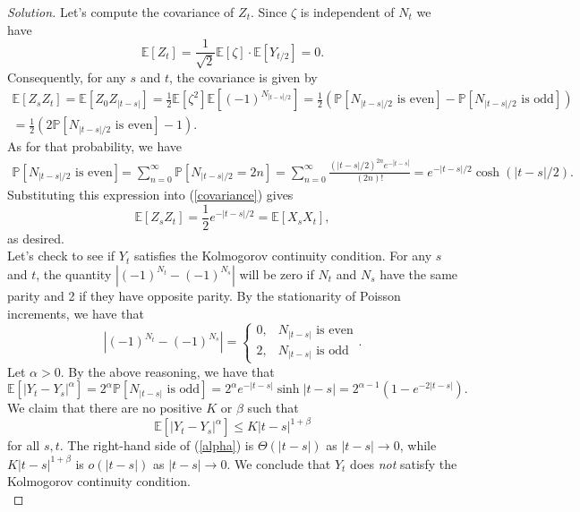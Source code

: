 \documentclass[11pt,letterpaper]{report}
\newcommand{\E}{\mathbb{E}}
\newcommand{\Prob}{\mathbb{P}}
\newenvironment{solution}
{\begin{proof}[Solution]}
{\end{proof}}
\begin{document}
\begin{solution}
	\noindent Let's compute the covariance of $Z_t$. Since $\zeta$ is independent of $N_t$ we have
	\[
	\E[Z_t] = \frac{1}{\sqrt{2}}\E[\zeta]\cdot \E[Y_{t/2}] = 0.
	\]
	Consequently, for any $s$ and $t$, the covariance is given by
	\begin{multline}\label{covariance}
		\E[Z_sZ_t] = \E[Z_0Z_{|t-s|}] = \frac{1}{2}\E[\zeta^2]\E\left[(-1)^{N_{|t-s|/2}}\right] = \frac{1}{2}\left(\Prob[N_{|t-s|/2}\text{ is even}] - \Prob[N_{|t-s|/2}\text{ is odd}]\right)\\
		= \frac{1}{2}(2\Prob[N_{|t-s|/2}\text{ is even}] - 1).
	\end{multline}
	As for that probability, we have
	\begin{align*}
		\Prob[N_{|t-s|/2}\text{ is even}] &= \sum_{n=0}^\infty\Prob[N_{|t-s|/2} = 2n] = \sum_{n=0}^\infty \frac{(|t-s|/2)^{2n}e^{-|t-s|}}{(2n)!} = e^{-|t-s|/2}\cosh(|t-s|/2).
	\end{align*}
	Substituting this expression into (\ref{covariance}) gives
	\[
	\E[Z_sZ_t] = \frac{1}{2}e^{-|t-s|/2} = \E[X_sX_t],
	\]
	as desired.\\

	\noindent Let's check to see if $Y_t$ satisfies the Kolmogorov continuity condition. For any $s$ and $t$, the quantity $|(-1)^{N_t} - (-1)^{N_s}|$ will be zero if $N_t$ and $N_s$ have the same parity and 2 if they have opposite parity. By the stationarity of Poisson increments, we have that
	\[
	\left|(-1)^{N_t} - (-1)^{N_s}\right| = \begin{cases}
		0,& N_{|t-s|}\text{ is even}\\
		2,& N_{|t-s|}\text{ is odd}
	\end{cases}.
	\]
	Let $\alpha>0$. By the above reasoning, we have that
	\begin{equation}\label{alpha}
	\E[|Y_t-Y_s|^\alpha] = 2^\alpha\Prob[N_{|t-s|}\text{ is odd}] = 2^\alpha e^{-|t-s|}\sinh |t-s| = 2^{\alpha-1}\left(1-e^{-2|t-s|}\right).
	\end{equation}
	We claim that there are no positive $K$ or $\beta$ such that
	\[
	\E[|Y_t-Y_s|^\alpha] \leq K|t-s|^{1+\beta}
	\]
	for all $s,t$. The right-hand side of (\ref{alpha}) is $\Theta(|t-s|)$ as $|t-s|\to 0$, while $K|t-s|^{1+\beta}$ is $o(|t-s|)$ as $|t-s|\to 0$. We conclude that $Y_t$ does \textit{not} satisfy the Kolmogorov continuity condition.\\


\end{solution}
\end{document}
